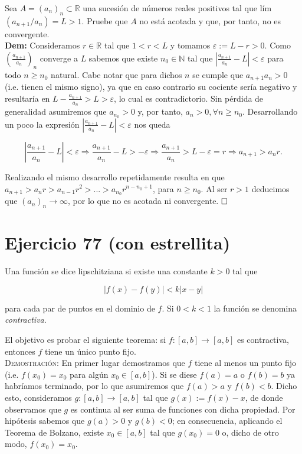 \documentclass{article}
\begin{document}
Sea $A = (a_n)_n \subset \mathbb{R}$ una sucesión de números reales positivos tal que lím$(a_{n + 1}/a_n) = L > 1$. Pruebe que $A$ no está acotada y que, por tanto, no es convergente. \\

\noindent\textbf{Dem:} Consideramos $r \in \mathbb{R}$ tal que $1 < r < L$ y tomamos $\varepsilon := L - r > 0$. Como $(\frac{a_{n + 1}}{a_n})_n$ converge a $L$ sabemos que existe $n_0 \in \mathbb{N}$ tal que $|\frac{a_{n + 1}}{a_n} - L| < \varepsilon$ para todo $n \geq n_0$ natural. Cabe notar que para dichos $n$ se cumple que $a_{n + 1}a_n > 0$ (i.e. tienen el mismo signo), ya que en caso contrario su cociente sería negativo y resultaría en $L - \frac{a_{n + 1}}{a_n} > L > \varepsilon$, lo cual es contradictorio. Sin pérdida de generalidad asumiremos que $a_{n_0} > 0$ y, por tanto, $a_n > 0, \forall n \geq n_0$. Desarrollando un poco la expresión $|\frac{a_{n + 1}}{a_n} - L| < \varepsilon$ nos queda

\[\left|\frac{a_{n + 1}}{a_n} - L\right| < \varepsilon \Longrightarrow \frac{a_{n + 1}}{a_n} - L > -\varepsilon \Longrightarrow \frac{a_{n + 1}}{a_n} > L - \varepsilon = r \Longrightarrow a_{n + 1} > a_nr.\]

Realizando el mismo desarrollo repetidamente resulta en que $a_{n + 1} > a_nr > a_{n - 1}r^2 > ... > a_{n_0}r^{n - n_0 + 1}$, para $n \geq n_0$. Al ser $r > 1$ deducimos que $(a_n)_n \longrightarrow \infty$, por lo que no es acotada ni convergente. $\hfill\square$

\newpage

\section{Ejercicio 77 (con estrellita)}

Una función se dice lipschitziana si existe una constante $k > 0$ tal que

\[|f(x) - f(y)| < k|x - y|\]

para cada par de puntos en el dominio de $f$. Si $0 < k < 1$ la función se denomina \textit{contractiva}.

El objetivo es probar el siguiente teorema: si $f : [a, b] \longrightarrow [a, b]$ es contractiva, entonces $f$ tiene un único punto fijo. \\

\noindent\textsc{Demostración}: En primer lugar demostramos que $f$ tiene al menos un punto fijo (i.e. $f(x_0) = x_0$ para algún $x_0 \in [a, b]$). Si se diese $f(a) = a$ o $f(b) = b$ ya habríamos terminado, por lo que asumiremos que $f(a) > a$ y $f(b) < b$. Dicho esto, consideramos $g : [a, b] \longrightarrow [a, b]$ tal que $g(x) := f(x) - x$, de donde observamos que $g$ es continua al ser suma de funciones con dicha propiedad. Por hipótesis sabemos que $g(a) > 0$ y $g(b) < 0$; en consecuencia, aplicando el Teorema de Bolzano, existe $x_0 \in [a, b]$ tal que $g(x_0) = 0$ o, dicho de otro modo, $f(x_0) = x_0$.
\end{document}
